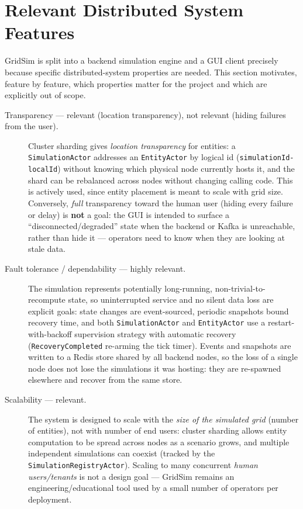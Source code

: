 \documentclass{scrreprt}
\begin{document}
  \section{Relevant Distributed System Features}
  \label{sec:distributed-features}

  GridSim is split into a backend simulation engine and a GUI client precisely because specific
  distributed-system properties are needed. This section motivates, feature
  by feature, which properties matter for the project and which are explicitly
  out of scope.

  \begin{description}

  \item[Transparency --- relevant (location transparency), not relevant
    (hiding failures from the user).]
  Cluster sharding gives \emph{location transparency} for entities: a
  \texttt{SimulationActor} addresses an \texttt{EntityActor} by logical id
  (\texttt{simulationId-localId}) without knowing which physical node
  currently hosts it, and the shard can be rebalanced across nodes without
  changing calling code. This is actively used, since entity placement is
  meant to scale with grid size. Conversely, \emph{full} transparency toward
  the human user (hiding every failure or delay) is \textbf{not} a goal: the
  GUI is intended to surface a ``disconnected/degraded'' state when the
  backend or Kafka is unreachable,
  rather
  than hide it --- operators need to know when they are looking at stale
  data.

  \item[Fault tolerance / dependability --- highly relevant.]
  The simulation represents potentially long-running,
  non-trivial-to-recompute
  state, so uninterrupted service and no silent data loss are explicit
  goals:
  state changes are event-sourced, periodic snapshots bound recovery time,
  and
  both \texttt{SimulationActor} and \texttt{EntityActor} use a
  restart-with-backoff supervision strategy with automatic recovery
  (\texttt{RecoveryCompleted} re-arming the tick timer). Events and snapshots are written to a
  Redis store shared by all backend nodes, so the loss of a single node does not lose the
  simulations it was hosting: they are re-spawned elsewhere and recover from the same store.

  \item[Scalability --- relevant.]
  The system is designed to scale with the \emph{size of the simulated grid}
  (number of entities), not with number of end users: cluster sharding
  allows
  entity computation to be spread across nodes as a scenario grows, and
  multiple independent simulations can coexist (tracked by the
  \texttt{SimulationRegistryActor}). Scaling to many concurrent \emph{human
  users/tenants} is not a design goal --- GridSim remains an
  engineering/educational tool used by a small number of operators per
  deployment.


\end{description}
\end{document}
